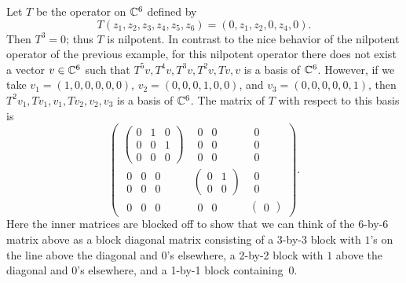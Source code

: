 \begin{example}\label{ax:8.43}
Let $T$ be the operator on $\mathbb{C}^6$ defined by
\[ T(z_1,z_2,z_3,z_4,z_5,z_6) = (0,z_1,z_2,0,z_4,0). \]
Then $T^3=0$; thus $T$ is nilpotent. In contrast to the nice behavior of the
nilpotent operator of the previous example, for this nilpotent operator there
does not exist a vector $v\in\mathbb{C}^6$ such that $T^5v,T^4v,T^3v,T^2v,Tv,v$ is a
basis of $\mathbb{C}^6$. However, if we take $v_1=(1,0,0,0,0,0)$, $v_2=(0,0,0,1,0,0)$,
and $v_3=(0,0,0,0,0,1)$, then $T^2v_1,Tv_1,v_1,Tv_2,v_2,v_3$ is a basis of
$\mathbb{C}^6$. The matrix of $T$ with respect to this basis is
\[ \begin{pmatrix}
\begin{pmatrix}0&1&0\\0&0&1\\0&0&0\end{pmatrix}
  & \begin{matrix}0&0\\0&0\\0&0\end{matrix}
  & \begin{matrix}0\\0\\0\end{matrix}\\
\begin{matrix}0&0&0\\0&0&0\end{matrix}
  & \begin{pmatrix}0&1\\0&0\end{pmatrix}
  & \begin{matrix}0\\0\end{matrix}\\
\begin{matrix}0&0&0\end{matrix}
  & \begin{matrix}0&0\end{matrix}
  & \begin{pmatrix}0\end{pmatrix}
\end{pmatrix}. \]
Here the inner matrices are blocked off to show that we can think of the
6-by-6 matrix above as a block diagonal matrix consisting of a 3-by-3 block
with $1$'s on the line above the diagonal and $0$'s elsewhere, a 2-by-2 block
with $1$ above the diagonal and $0$'s elsewhere, and a 1-by-1 block
containing~$0$.
\end{example}

